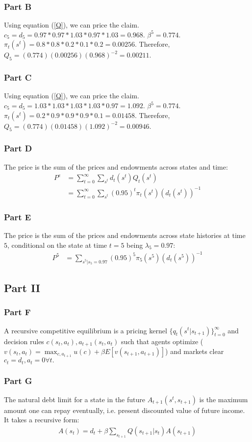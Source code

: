 \documentclass[11pt]{article} %
\begin{document}
\subsubsection{Part B}
Using equation (\ref{Q}), we can price the claim. $c_5 = d_5 = 0.97*0.97*1.03*0.97*1.03 = 0.968$. $\beta^5 = 0.774$. $\pi_t(s^t) = 0.8*0.8*0.2*0.1*0.2 = 0.00256$. Therefore, $Q_5 = ( 0.774)(0.00256)(0.968)^{-2} = 0.00211$.
\subsubsection{Part C}
Using equation (\ref{Q}), we can price the claim. $c_5 = d_5 = 1.03*1.03*1.03*1.03*0.97 = 1.092$. $\beta^5 = 0.774$. $\pi_t(s^t) = 0.2*0.9*0.9*0.9*0.1 = 0.01458$. Therefore, $Q_5 =  ( 0.774)(0.01458)(1.092)^{-2} = 0.00946$.
\subsubsection{Part D}
The price is the sum of the prices and endowments across states and time:
\begin{align*}
P^e &= \sum_{t=0}^{\infty}\sum_{s^t} d_t(s^t)Q_{t}(s^t)\\
&= \sum_{t=0}^{\infty}\sum_{s^t} (0.95)^t \pi_t(s^t)(d_t(s^t))^{-1}
\end{align*} 
\subsubsection{Part E}
The price is the sum of the prices and endowments across state histories at time $5$, conditional on the state at time $t=5$ being $\lambda_5 = 0.97$:
\begin{align*}
P^5 &= \sum_{s^5|s_5= 0.97} (0.95)^5 \pi_5(s^5)(d_t(s^5))^{-1}
\end{align*}
\subsection{Part II}
\subsubsection{Part F}
A recursive competitive equilibrium is a pricing kernel $\{q_t(s^t|s_{t+1})\}_{t=0}^{\infty}$ and decision rules $ c(s_t,a_{t}),a_{t+1}(s_t,a_{t}) $ such that agents optimize ($v(s_t,a_t) = \max_{c,a_{t+1}} u(c) + \beta E[v(s_{t+1},a_{t+1})]$) and markets clear $c_t  = d_t, a_{t} = 0 \forall t.$
\subsubsection{Part G}
The natural debt limit for a state in the future $A_{t+1}(s^t,s_{t+1})$ is the maximum amount one can repay eventually, i.e. present discounted value of future income. It takes a recursive form:
\begin{align*}
A(s_t) = d_{t} + \beta\sum_{s_{t+1}}Q(s_{t+1}|s_t)A(s_{t+1})
\end{align*}
\end{document}
